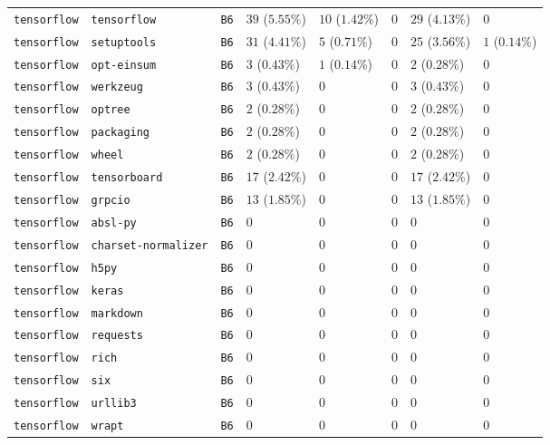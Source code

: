 \begin{table}
\begin{tabular}{llllllll}
\texttt{tensorflow} & \texttt{tensorflow} & \texttt{B6} & $39$ ($5.55\%$) & $10$ ($1.42\%$) & $0$ & $29$ ($4.13\%$) & $0$ \\
\texttt{tensorflow} & \texttt{setuptools} & \texttt{B6} & $31$ ($4.41\%$) & $5$ ($0.71\%$) & $0$ & $25$ ($3.56\%$) & $1$ ($0.14\%$) \\
\texttt{tensorflow} & \texttt{opt-einsum} & \texttt{B6} & $3$ ($0.43\%$) & $1$ ($0.14\%$) & $0$ & $2$ ($0.28\%$) & $0$ \\
\texttt{tensorflow} & \texttt{werkzeug} & \texttt{B6} & $3$ ($0.43\%$) & $0$ & $0$ & $3$ ($0.43\%$) & $0$ \\
\texttt{tensorflow} & \texttt{optree} & \texttt{B6} & $2$ ($0.28\%$) & $0$ & $0$ & $2$ ($0.28\%$) & $0$ \\
\texttt{tensorflow} & \texttt{packaging} & \texttt{B6} & $2$ ($0.28\%$) & $0$ & $0$ & $2$ ($0.28\%$) & $0$ \\
\texttt{tensorflow} & \texttt{wheel} & \texttt{B6} & $2$ ($0.28\%$) & $0$ & $0$ & $2$ ($0.28\%$) & $0$ \\
\texttt{tensorflow} & \texttt{tensorboard} & \texttt{B6} & $17$ ($2.42\%$) & $0$ & $0$ & $17$ ($2.42\%$) & $0$ \\
\texttt{tensorflow} & \texttt{grpcio} & \texttt{B6} & $13$ ($1.85\%$) & $0$ & $0$ & $13$ ($1.85\%$) & $0$ \\
\texttt{tensorflow} & \texttt{absl-py} & \texttt{B6} & $0$ & $0$ & $0$ & $0$ & $0$ \\
\texttt{tensorflow} & \texttt{charset-normalizer} & \texttt{B6} & $0$ & $0$ & $0$ & $0$ & $0$ \\
\texttt{tensorflow} & \texttt{h5py} & \texttt{B6} & $0$ & $0$ & $0$ & $0$ & $0$ \\
\texttt{tensorflow} & \texttt{keras} & \texttt{B6} & $0$ & $0$ & $0$ & $0$ & $0$ \\
\texttt{tensorflow} & \texttt{markdown} & \texttt{B6} & $0$ & $0$ & $0$ & $0$ & $0$ \\
\texttt{tensorflow} & \texttt{requests} & \texttt{B6} & $0$ & $0$ & $0$ & $0$ & $0$ \\
\texttt{tensorflow} & \texttt{rich} & \texttt{B6} & $0$ & $0$ & $0$ & $0$ & $0$ \\
\texttt{tensorflow} & \texttt{six} & \texttt{B6} & $0$ & $0$ & $0$ & $0$ & $0$ \\
\texttt{tensorflow} & \texttt{urllib3} & \texttt{B6} & $0$ & $0$ & $0$ & $0$ & $0$ \\
\texttt{tensorflow} & \texttt{wrapt} & \texttt{B6} & $0$ & $0$ & $0$ & $0$ & $0$ \\
\bottomrule
\end{tabular}
\end{table}

